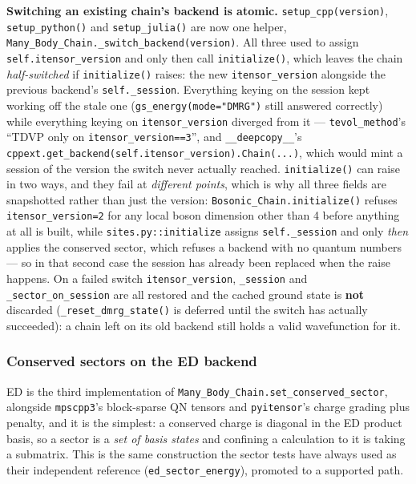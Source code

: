 \documentclass[11pt]{article}
\begin{document}
\textbf{Switching an existing chain's backend is atomic.}
\texttt{setup\_cpp(version)}, \texttt{setup\_python()} and
\texttt{setup\_julia()} are now one helper,
\texttt{Many\_Body\_Chain.\_switch\_backend(version)}. All three used to
assign \texttt{self.itensor\_version} and only then call
\texttt{initialize()}, which leaves the chain \emph{half-switched} if
\texttt{initialize()} raises: the new \texttt{itensor\_version} alongside
the previous backend's \texttt{self.\_session}. Everything keying on the
session kept working off the stale one
(\texttt{gs\_energy(mode="DMRG")} still answered correctly) while
everything keying on \texttt{itensor\_version} diverged from it ---
\texttt{tevol\_method}'s ``TDVP only on \texttt{itensor\_version==3}'',
and \texttt{\_\_deepcopy\_\_}'s
\texttt{cppext.get\_backend(self.itensor\_version).Chain(...)}, which
would mint a session of the version the switch never actually reached.
\texttt{initialize()} can raise in two ways, and they fail at
\emph{different points}, which is why all three fields are snapshotted
rather than just the version: \texttt{Bosonic\_Chain.initialize()}
refuses \texttt{itensor\_version=2} for any local boson dimension other
than 4 before anything at all is built, while
\texttt{sites.py::initialize} assigns \texttt{self.\_session} and only
\emph{then} applies the conserved sector, which refuses a backend with no
quantum numbers --- so in that second case the session has already been
replaced when the raise happens. On a failed switch
\texttt{itensor\_version}, \texttt{\_session} and
\texttt{\_sector\_on\_session} are all restored and the cached ground
state is \textbf{not} discarded (\texttt{\_reset\_dmrg\_state()} is
deferred until the switch has actually succeeded): a chain left on its
old backend still holds a valid wavefunction for it.

\subsubsection{Conserved sectors on the ED backend}

ED is the third implementation of
\texttt{Many\_Body\_Chain.set\_conserved\_sector}, alongside
\texttt{mpscpp3}'s block-sparse QN tensors and \texttt{pyitensor}'s
charge grading plus penalty, and it is the simplest: a conserved charge is
diagonal in the ED product basis, so a sector is a \emph{set of basis
states} and confining a calculation to it is taking a submatrix. This is
the same construction the sector tests have always used as their
independent reference (\texttt{ed\_sector\_energy}), promoted to a
supported path.
\end{document}
